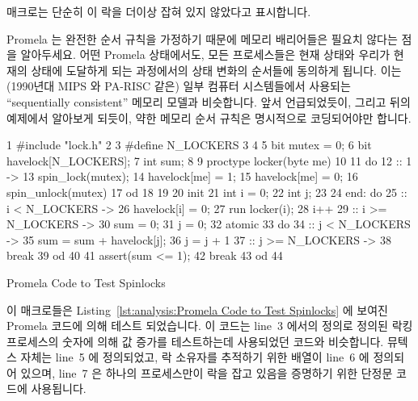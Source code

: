  매크로는 단순히 이 락을 더이상 잡혀 있지 않았다고
표시합니다.

Promela 는 완전한 순서 규칙을 가정하기 때문에 메모리 배리어들은 필요치 않다는
점을 알아두세요.
어떤 Promela 상태에서도, 모든 프로세스들은 현재 상태와 우리가 현재의 상태에
도달하게 되는 과정에서의 상태 변화의 순서들에 동의하게 됩니다.
이는 (1990년대 MIPS 와 PA-RISC 같은) 일부 컴퓨터 시스템들에서 사용되는
``sequentially consistent'' 메모리 모델과 비슷합니다.
앞서 언급되었듯이, 그리고 뒤의 예제에서 알아보게 되듯이, 약한 메모리 순서
규칙은 명시적으로 코딩되어야만 합니다.
\iffalse

The \co{spin_unlock()} macro simply marks the lock as no
longer held.

Note that memory barriers are not needed because Promela assumes
full ordering.
In any given Promela state, all processes agree on both the current
state and the order of state changes that caused us to arrive at
the current state.
This is analogous to the ``sequentially consistent'' memory model
used by a few computer systems (such as 1990s MIPS and PA-RISC).
As noted earlier, and as will be seen in a later example,
weak memory ordering must be explicitly coded.
\fi

\begin{listing}[tb]
{ \scriptsize
\begin{verbbox}
  1 #include "lock.h"
  2
  3 #define N_LOCKERS 3
  4
  5 bit mutex = 0;
  6 bit havelock[N_LOCKERS];
  7 int sum;
  8
  9 proctype locker(byte me)
 10 {
 11   do
 12   :: 1 ->
 13     spin_lock(mutex);
 14     havelock[me] = 1;
 15     havelock[me] = 0;
 16     spin_unlock(mutex)
 17   od
 18 }
 19
 20 init {
 21   int i = 0;
 22   int j;
 23
 24 end:  do
 25   :: i < N_LOCKERS ->
 26     havelock[i] = 0;
 27     run locker(i);
 28     i++
 29   :: i >= N_LOCKERS ->
 30     sum = 0;
 31     j = 0;
 32     atomic {
 33       do
 34       :: j < N_LOCKERS ->
 35         sum = sum + havelock[j];
 36         j = j + 1
 37       :: j >= N_LOCKERS ->
 38         break
 39       od
 40     }
 41     assert(sum <= 1);
 42     break
 43   od
 44 }
\end{verbbox}
}
\centering
\theverbbox
\caption{Promela Code to Test Spinlocks}
\label{lst:analysis:Promela Code to Test Spinlocks}
\end{listing}

이 매크로들은
Listing~\ref{lst:analysis:Promela Code to Test Spinlocks}
에 보여진 Promela 코드에 의해 테스트 되었습니다.
이 코드는 line~3 에서의  정의로 정의된 락킹 프로세스의 숫자에
의해 값 증가를 테스트하는데 사용되었던 코드와 비슷합니다.
뮤텍스 자체는 line~5 에 정의되었고, 락 소유자를 추적하기 위한 배열이 line~6 에
정의되어 있으며, line~7 은 하나의 프로세스만이 락을 잡고 있음을 증명하기 위한
단정문 코드에 사용됩니다.

